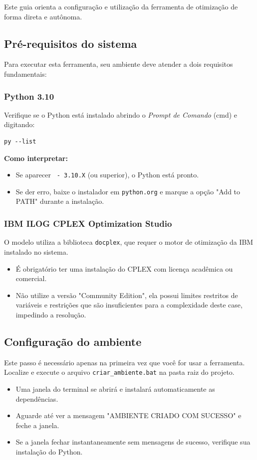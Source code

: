 Este guia orienta a configuração e utilização da ferramenta de otimização de forma direta e autônoma.

\subsection{Pré-requisitos do sistema}

Para executar esta ferramenta, seu ambiente deve atender a dois requisitos fundamentais:

\subsubsection{Python 3.10}
Verifique se o Python está instalado abrindo o \textit{Prompt de Comando} (cmd) e digitando:

\begin{verbatim}
py --list
\end{verbatim}

\textbf{Como interpretar:}
\begin{itemize}
    \item Se aparecer \texttt{ - 3.10.X} (ou superior), o Python está pronto.
    \item Se der erro, baixe o instalador em \texttt{python.org} e marque a opção "Add to PATH" durante a instalação.
\end{itemize}

\subsubsection{IBM ILOG CPLEX Optimization Studio}
O modelo utiliza a biblioteca \texttt{docplex}, que requer o motor de otimização da IBM instalado no sistema.

\begin{itemize}
    \item É obrigatório ter uma instalação do CPLEX com licença acadêmica ou comercial.
    \item Não utilize a versão "Community Edition", ela possui limites restritos de variáveis e restrições que são insuficientes para a complexidade deste case, impedindo a resolução.
\end{itemize}


\subsection{Configuração do ambiente}

Este passo é necessário apenas na primeira vez que você for usar a ferramenta. Localize e execute o arquivo \texttt{criar\_ambiente.bat} na pasta raiz do projeto.
\begin{itemize}
    \item Uma janela do terminal se abrirá e instalará automaticamente as dependências.
    \item Aguarde até ver a mensagem "AMBIENTE CRIADO COM SUCESSO" e feche a janela.
    \item Se a janela fechar instantaneamente sem mensagens de sucesso, verifique sua instalação do Python.
\end{itemize}

